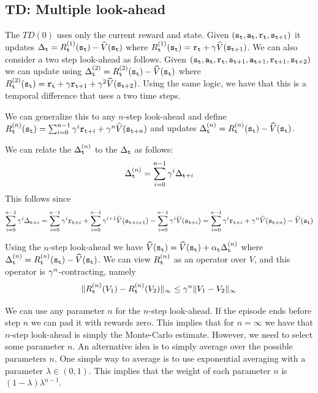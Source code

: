 \subsection{TD: Multiple look-ahead}

The $TD(0)$ uses only the current reward and state. Given
$({\tt s}_{\tt t},{\tt a}_{\tt t},{\tt r}_{\tt t},{\tt s}_{{\tt t}+1})$ it
updates $\Delta_{\tt t}=R^{(1)}_{\tt t}({\tt s}_{\tt t}) -
\widehat{V}({\tt s}_{\tt t})$ where $R^{(1)}_{\tt t}({\tt s}_{\tt t})=
{\tt r}_{\tt t} +\gamma \widehat{V}({\tt s}_{{\tt t}+1})$. We can
also consider a two step look-ahead as follows. Given
$({\tt s}_{\tt t},{\tt a}_{\tt t},{\tt r}_{\tt t},{\tt s}_{{\tt t}+1},{\tt a}_{{\tt t}+1},{\tt r}_{{\tt t}+1},{\tt s}_{{\tt t}+2})$
we can update using
$\Delta^{(2)}_{\tt t}=R^{(2)}_{\tt t}({\tt s}_{\tt t}) -
\widehat{V}({\tt s}_{\tt t})$ where $R^{(2)}_{\tt t}({\tt s}_{\tt t})=
{\tt r}_{\tt t}+\gamma {\tt r}_{{\tt t}+1} +\gamma^2
\widehat{V}({\tt s}_{{\tt t}+2})$. Using the same logic, we have that
this is a temporal difference that uses a two time steps.

We can generalize this to any $n$-step look-ahead and define
$R^{(n)}_{\tt t}({\tt s}_{\tt t})= \sum_{i=0}^{n-1} \gamma^i
{\tt r}_{{\tt t}+i}+\gamma^n \widehat{V}({\tt s}_{{\tt t}+n})$ and
updates $\Delta^{(n)}_{\tt t}=R^{(n)}_{\tt t}({\tt s}_{\tt t}) -
\widehat{V}({\tt s}_{\tt t})$.

We can relate the $\Delta^{(n)}_{\tt t}$ to the $\Delta_{\tt t}$ as
follows:
\[
\Delta^{(n)}_{\tt t}=\sum_{i=0}^{n-1} \gamma^i \Delta_{{\tt t}+i}
\]
This follows since
\[
\sum_{i=0}^{n-1} \gamma^i \Delta_{{\tt t}+i}=\sum_{i=0}^{n-1}
\gamma^i {\tt r}_{{\tt t}+i}+ \sum_{i=0}^{n-1} \gamma^{i+1}
\widehat{V}({\tt s}_{{\tt t}+i+1})- \sum_{i=0}^{n-1} \gamma^{i}
\widehat{V}({\tt s}_{{\tt t}+i})=\sum_{i=0}^{n-1} \gamma^i
{\tt r}_{{\tt t}+i}+\gamma^n
\widehat{V}({\tt s}_{{\tt t}+n})-\widehat{V}({\tt s}_{\tt t})
\]

Using the $n$-step look-ahead we have
$\widehat{V}({\tt s}_{\tt t})=\widehat{V}({\tt s}_{\tt t})+\alpha_{\tt t}
\Delta^{(n)}_{\tt t}$ where
$\Delta^{(n)}_{\tt t}=R^{(n)}_{\tt t}({\tt s}_{\tt t})-\widehat{V}({\tt s}_{\tt t})$.
We can view $R^{(n)}_{\tt t}$ as an operator over $V$, and this operator is
$\gamma^n$-contracting, namely
\[
\| R^{(n)}_{\tt t}(V_1)-R^{(n)}_{\tt t}(V_2)\|_\infty \leq \gamma^n
\|V_1-V_2\|_\infty
\]

We can use any parameter $n$ for the $n$-step look-ahead. If the
episode ends before step $n$ we can pad it with rewards zero. This
implies that for $n=\infty$ we have that $n$-step look-ahead is
simply the Monte-Carlo estimate. However, we need to select some
parameter $n$. An alternative idea is to simply average over the
possible parameters $n$. One simple way to average is to use
exponential averaging with a parameter $\lambda\in(0,1)$. This
implies that the weight of each parameter $n$ is
$(1-\lambda)\lambda^{n-1}$.

